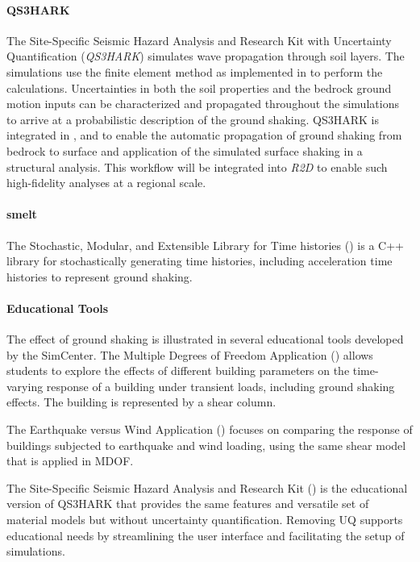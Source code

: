 \paragraph{QS3HARK} The Site-Specific Seismic Hazard Analysis and Research Kit with Uncertainty Quantification (\emph{QS3HARK}) simulates wave propagation through soil layers. The simulations use the finite element method as implemented in  to perform the calculations. Uncertainties in both the soil properties and the bedrock ground motion inputs can be characterized and propagated throughout the simulations to arrive at a probabilistic description of the ground shaking. QS3HARK is integrated in , and  to enable the automatic propagation of ground shaking from bedrock to surface and application of the simulated surface shaking in a structural analysis. This workflow will be integrated into \emph{R2D} to enable such high-fidelity analyses at a regional scale.

\paragraph{smelt} The Stochastic, Modular, and Extensible Library for Time histories () is a C++ library for stochastically generating time histories, including acceleration time histories to represent ground shaking.

\paragraph{Educational Tools}
The effect of ground shaking is illustrated in several educational tools developed by the SimCenter. The Multiple Degrees of Freedom Application () allows students to explore the effects of different building parameters on the time-varying response of a building under transient loads, including ground shaking effects. The building is represented by a shear column. 

\noindent The Earthquake versus Wind Application () focuses on comparing the response of buildings subjected to earthquake and wind loading, using the same shear model that is applied in MDOF.

\noindent The Site-Specific Seismic Hazard Analysis and Research Kit () is the educational version of QS3HARK that provides the same features and versatile set of material models but without uncertainty quantification. Removing UQ supports educational needs by streamlining the user interface and facilitating the setup of simulations.

